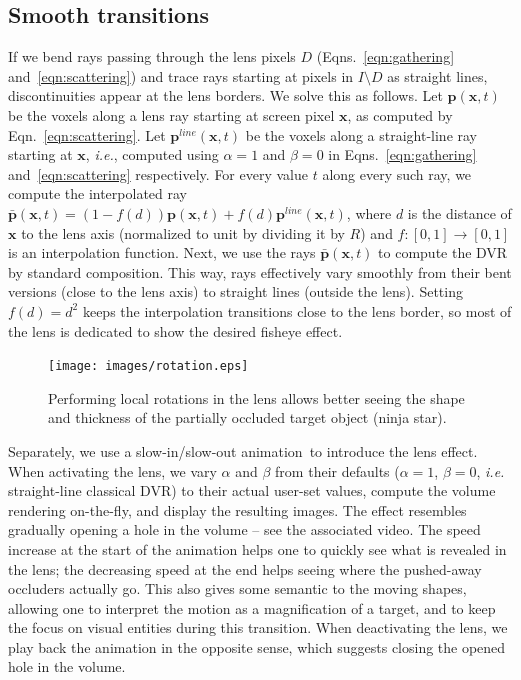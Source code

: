 \subsection{Smooth transitions}
\label{continuity}
%
If we bend rays passing through the lens pixels $D$ (Eqns.~\ref{eqn:gathering} and~\ref{eqn:scattering}) and trace rays starting at pixels in $I \setminus D$ as straight lines, discontinuities appear at the lens borders. We solve this as follows. Let $\mathbf{p}(\mathbf{x},t)$ be the voxels along a lens ray starting at screen pixel $\mathbf{x}$, as computed by Eqn.~\ref{eqn:scattering}. Let $\mathbf{p}^{line}(\mathbf{x},t)$ be the voxels along a straight-line ray starting at $\mathbf{x}$, \emph{i.e.}, computed using $\alpha=1$ and $\beta=0$ in Eqns.~\ref{eqn:gathering} and~\ref{eqn:scattering} respectively. For every value $t$ along every such ray, we compute the interpolated ray $\bar{\mathbf{p}}(\mathbf{x},t) = (1-f(d))\mathbf{p}(\mathbf{x},t) + f(d)\mathbf{p}^{line}(\mathbf{x},t)$, where $d$ is the distance of $\mathbf{x}$ to the lens axis (normalized to unit by dividing it by $R$) and $f : [0,1] \rightarrow [0,1]$ is an interpolation function. Next, we use the rays $\bar{\mathbf{p}}(\mathbf{x},t)$ to compute the DVR by standard composition. This way, rays effectively vary smoothly from their bent versions (close to the lens axis) to straight lines (outside the lens). Setting $f(d) = d^2$ keeps the interpolation transitions close to the lens border, so most of the lens is dedicated to show the desired fisheye effect.

\begin{figure}[htbp!]
\centering
\texttt{[image: images/rotation.eps]}
\vspace{-0.15cm}
\caption{Performing local rotations in the lens allows better seeing the shape and thickness of the partially occluded target object (ninja star).}
\label{f:rotation}
\vspace{-0.15cm}
\end{figure}

Separately, we use a slow-in/slow-out animation\,\cite{Dragicevic:2011:TDA:1978942.1979233} to introduce the lens effect. When activating the lens, we vary $\alpha$ and $\beta$ from their defaults ($\alpha=1$, $\beta=0$, \emph{i.e.} straight-line classical DVR) to their actual user-set values, compute the volume rendering on-the-fly, and display the resulting images. The effect resembles gradually opening a hole in the volume -- see the associated video. The speed increase at the start of the animation helps one to quickly see what is revealed in the lens; the decreasing speed at the end helps seeing where the pushed-away occluders actually go. This also gives some semantic to the moving shapes, allowing one to interpret the motion as a magnification of a target, and to keep the focus on visual entities during this transition. When deactivating the lens, we play back the animation in the opposite sense, which suggests closing the opened hole in the volume.

